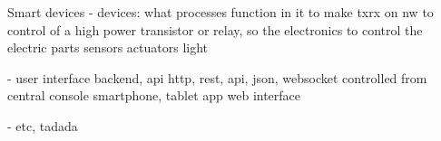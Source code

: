 Smart devices 
- devices:
what processes function in it to make txrx on nw to control of a high power transistor or relay, so the electronics to control the electric parts
sensors
actuators
light



- user interface
backend, api
http, rest, api, json, websocket
controlled from central console
smartphone, tablet app
web interface


- etc, tadada
